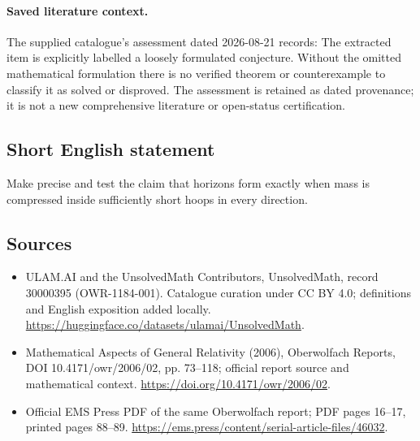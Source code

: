 \documentclass[11pt]{article}
\begin{document}
\paragraph{Saved literature context.} The supplied catalogue's assessment dated 2026-08-21 records: The extracted item is explicitly labelled a loosely formulated conjecture. Without the omitted mathematical formulation there is no verified theorem or counterexample to classify it as solved or disproved. The assessment is retained as dated provenance; it is not a new comprehensive literature or open-status certification.
\subsection{Short English statement}
Make precise and test the claim that horizons form exactly when mass is compressed inside sufficiently short hoops in every direction.
\subsection{Sources}
\begin{itemize}
\item[\hypertarget{source:30000395:1}{S1}] ULAM.AI and the UnsolvedMath Contributors, UnsolvedMath, record 30000395 (OWR-1184-001). Catalogue curation under CC BY 4.0; definitions and English exposition added locally.
\url{https://huggingface.co/datasets/ulamai/UnsolvedMath}.
\item[\hypertarget{source:30000395:2}{S2}] Mathematical Aspects of General Relativity (2006), Oberwolfach Reports, DOI 10.4171/owr/2006/02, pp. 73--118; official report source and mathematical context.
\url{https://doi.org/10.4171/owr/2006/02}.
\item[\hypertarget{source:30000395:3}{S3}] Official EMS Press PDF of the same Oberwolfach report; PDF pages 16--17, printed pages 88--89.
\url{https://ems.press/content/serial-article-files/46032}.
\end{itemize}
\label{end:30000395}
\end{document}
